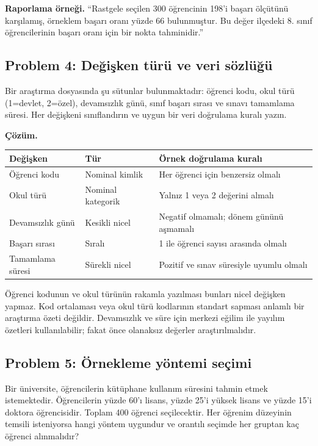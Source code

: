 \textbf{Raporlama örneği.} ``Rastgele seçilen 300 öğrencinin 198'i başarı
ölçütünü karşılamış, örneklem başarı oranı yüzde 66 bulunmuştur. Bu değer
ilçedeki 8. sınıf öğrencilerinin başarı oranı için bir nokta tahminidir.''

\subsection*{Problem 4: Değişken türü ve veri sözlüğü}

Bir araştırma dosyasında şu sütunlar bulunmaktadır: öğrenci kodu, okul türü
(1=devlet, 2=özel), devamsızlık günü, sınıf başarı sırası ve sınavı tamamlama
süresi. Her değişkeni sınıflandırın ve uygun bir veri doğrulama kuralı yazın.

\textbf{Çözüm.}

\begin{center}
\small
\begin{tabularx}{\textwidth}{@{}p{}p{}X@{}}
\toprule
Değişken & Tür & Örnek doğrulama kuralı \\
\midrule
Öğrenci kodu & Nominal kimlik & Her öğrenci için benzersiz olmalı \\
Okul türü & Nominal kategorik & Yalnız 1 veya 2 değerini almalı \\
Devamsızlık günü & Kesikli nicel & Negatif olmamalı; dönem gününü aşmamalı \\
Başarı sırası & Sıralı & 1 ile öğrenci sayısı arasında olmalı \\
Tamamlama süresi & Sürekli nicel & Pozitif ve sınav süresiyle uyumlu olmalı \\
\bottomrule
\end{tabularx}
\end{center}

Öğrenci kodunun ve okul türünün rakamla yazılması bunları nicel değişken
yapmaz. Kod ortalaması veya okul türü kodlarının standart sapması anlamlı bir
araştırma özeti değildir. Devamsızlık ve süre için merkezi eğilim ile yayılım
özetleri kullanılabilir; fakat önce olanaksız değerler araştırılmalıdır.

\subsection*{Problem 5: Örnekleme yöntemi seçimi}

Bir üniversite, öğrencilerin kütüphane kullanım süresini tahmin etmek
istemektedir. Öğrencilerin yüzde 60'ı lisans, yüzde 25'i yüksek lisans ve
yüzde 15'i doktora öğrencisidir. Toplam 400 öğrenci seçilecektir. Her öğrenim
düzeyinin temsili isteniyorsa hangi yöntem uygundur ve orantılı seçimde her
gruptan kaç öğrenci alınmalıdır?

